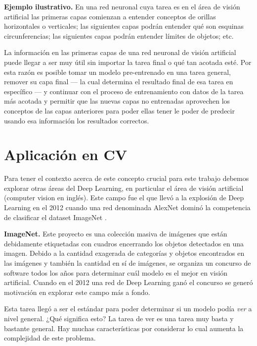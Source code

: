 \textbf{Ejemplo ilustrativo.} En una red neuronal cuya tarea es en el área de visión artificial las primeras capas comienzan a entender conceptos de orillas horizontales o verticales; las siguientes capas podrán entender qué son esquinas circunferencias; las siguientes capas podrán entender límites de objetos; etc.

La información en las primeras capas de una red neuronal de visión artificial puede llegar a ser muy útil sin importar la tarea final o qué tan acotada esté. Por esta razón es posible tomar un modelo pre-entrenado en una tarea general, remover su capa final --- la cual determina el resultado final de esa tarea en específico --- y continuar con el proceso de entrenamiento con datos de la tarea más acotada y permitir que las nuevas capas no entrenadas aprovechen los conceptos de las capas anteriores para poder ellas tener le poder de predecir usando esa información los resultados correctos.



\section{Aplicación en CV}
Para tener el contexto acerca de este concepto crucial para este trabajo debemos explorar otras áreas del Deep Learning, en particular el área de visión artificial (computer vision en inglés). Este campo fue el que llevó a la explosión de Deep Learning en el 2012 cuando una red denominada AlexNet dominó la competencia de clasificar el dataset ImageNet \parencite{deng2009imagenet}.

\textbf{ImageNet.} Este proyecto es una colección masiva de imágenes que están debidamente etiquetadas con cuadros encerrando los objetos detectados en una imagen. Debido a la cantidad exagerada de categorías y objetos encontrados en las imágenes y también la cantidad en sí de imágenes, se organiza un concurso de software todos los años para determinar cuál modelo es el mejor en visión artificial. Cuando en el 2012 una red de Deep Learning ganó el concurso se generó motivación en explorar este campo más a fondo.

Esta tarea llegó a ser el estándar para poder determinar si un modelo podía \emph{ver} a nivel general. ¿Qué significa esto? La tarea de ver es una tarea muy basta y bastante general. Hay muchas características por considerar lo cual aumenta la complejidad de este problema.


